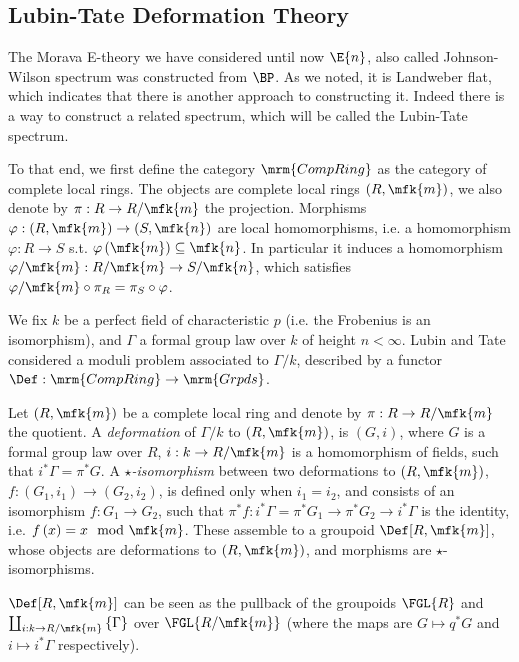 \subsection{Lubin-Tate Deformation Theory}\label{LT-def}

The Morava E-theory we have considered until now $\E{n}$, also called Johnson-Wilson spectrum was constructed from $\BP$.
As we noted, it is Landweber flat, which indicates that there is another approach to constructing it.
Indeed there is a way to construct a related spectrum, which will be called the Lubin-Tate spectrum.

To that end, we first define the category $\mrm{CompRing}$ as the category of complete local rings.
The objects are complete local rings $\left(R, \mfk{m}\right)$, we also denote by $\pi: R \to R/\mfk{m}$ the projection.
Morphisms $\varphi: \left(R, \mfk{m}\right) \to \left(S, \mfk{n}\right)$ are local homomorphisms, i.e. a homomorphism $\varphi: R \to S$ s.t. $\varphi\left(\mfk{m}\right) \subseteq \mfk{n}$.
In particular it induces a homomorphism $\varphi/\mfk{m}: R/\mfk{m} \to S/\mfk{n}$, which satisfies $\varphi/\mfk{m} \circ \pi_R = \pi_S \circ \varphi$.

We fix $k$ be a perfect field of characteristic $p$ (i.e. the Frobenius is an isomorphism), and $\Gamma$ a formal group law over $k$ of height $n < \infty$.
Lubin and Tate \cite{LT} considered a moduli problem associated to $\Gamma/k$, described by a functor $\Def: \mrm{CompRing} \to \mrm{Grpds}$.

\begin{definition}
	Let $\left(R, \mfk{m}\right)$ be a complete local ring and denote by $\pi: R \to R/\mfk{m}$ the quotient.
	A \emph{deformation} of $\Gamma/k$ to $\left(R, \mfk{m}\right)$, is $\left(G, i\right)$, where $G$ is a formal group law over $R$, $i: k \to R/\mfk{m}$ is a homomorphism of fields, such that $i^* \Gamma = \pi^* G$.
	A \emph{$\star$-isomorphism} between two deformations to $\left(R, \mfk{m}\right)$, $f: \left(G_1, i_1\right) \to \left(G_2, i_2\right)$, is defined only when $i_1 = i_2$, and consists of an isomorphism $f: G_1 \to G_2$, such that $\pi^* f: i^*\Gamma = \pi^* G_1 \to \pi^* G_2 \to i^*\Gamma$ is the identity, i.e. $f\left(x\right) = x \mod \mfk{m}$.
	These assemble to a groupoid $\Def[R, \mfk{m}]$, whose objects are deformations to $\left(R, \mfk{m}\right)$, and morphisms are $\star$-isomorphisms.
\end{definition}

\begin{remark}
	$\Def[R, \mfk{m}]$ can be seen as the pullback of the groupoids $\FGL{R}$ and $\coprod_{i: k \to R/\mfk{m}} \left\{\Gamma\right\}$ over $\FGL{R/\mfk{m}}$ (where the maps are $G \mapsto q^* G$ and $i \mapsto i^* \Gamma$ respectively).
\end{remark}


